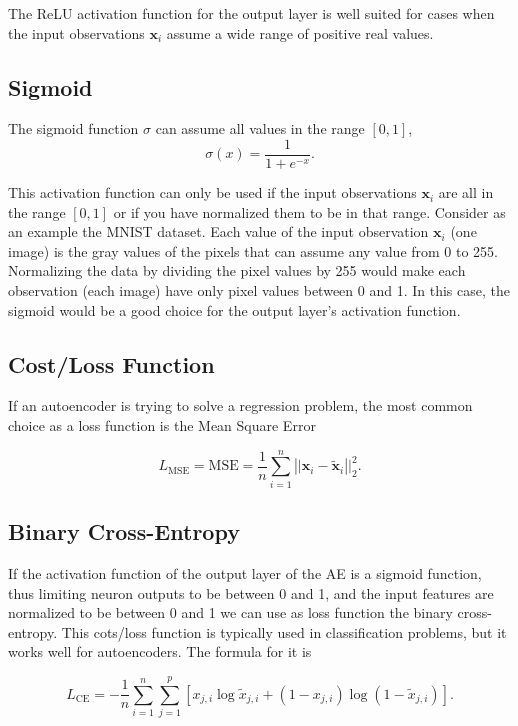 \documentclass[%
oneside,                 %
final,                   %
10pt]{article}
\begin{document}
The ReLU activation function for the output layer is well suited for cases when the input observations \(\mathbf{x}_{i}\) assume a wide range of positive real values.  

\subsection{Sigmoid}

The sigmoid function $\sigma$ can assume all values in the range $[0,1]$,
\[
\sigma\left(x\right) =\frac{1}{1+e^{-x}}.
\]

This activation function can only be used if the input observations
$\mathbf{x}_{i}$ are all in the range $[0,1]$  or if you have
normalized them to be in that range. Consider as an example the MNIST
dataset. Each value of the input observation $\mathbf{x}_{i}$ (one
image) is the gray values of the pixels that can assume any value from
0 to 255. Normalizing the data by dividing the pixel values by 255
would make each observation (each image) have only pixel values
between 0 and 1. In this case, the sigmoid would be a good choice for
the output layer's activation function.

\subsection{Cost/Loss Function}

If an autoencoder is trying to solve a regression problem, the most
common choice as a loss function is the Mean Square Error

\[
L_{\textrm{MSE}} = \textrm{MSE} = \frac{1}{n}\sum_{i = 1}^{n}\left\vert\vert\mathbf{x}_{i}-\tilde{\mathbf{x}}_{i}\right\vert\vert^{2}_2.
\]

\subsection{Binary Cross-Entropy}

If the activation function of the output layer of the AE is a sigmoid
function, thus limiting neuron outputs to be between 0 and 1, and the
input features are normalized to be between 0 and 1 we can use as loss
function the binary cross-entropy. This cots/loss function is
typically used in classification problems, but it works well for
autoencoders. The formula for it is

\[
L_{\textrm{CE}} = -\frac{1}{n}\sum_{i = 1}^{n}\sum_{j = 1}^{p}[x_{j,i} \log\tilde{x}_{j,i}+\left(1-x_{j,i}\right)\log (1-\tilde{x}_{j,i})].
\]
\end{document}
